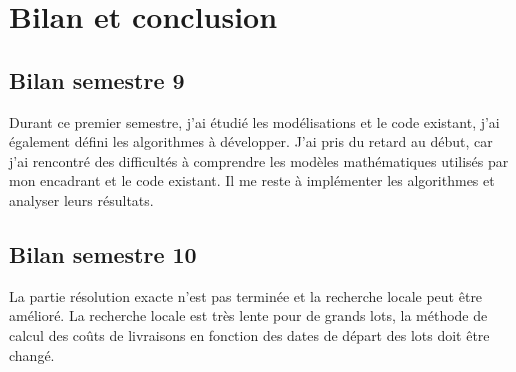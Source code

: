 \chapter{Bilan et conclusion}

\section{Bilan semestre 9}
Durant ce premier semestre, j'ai étudié les modélisations et le code existant, j'ai également défini les algorithmes à développer.
J'ai pris du retard au début, car j'ai rencontré des difficultés à comprendre les modèles mathématiques utilisés par mon encadrant et le code existant.
Il me reste à implémenter les algorithmes et analyser leurs résultats.

\section{Bilan semestre 10}

La partie résolution exacte n'est pas terminée et la recherche locale peut être amélioré.
La recherche locale est très lente pour de grands lots, la méthode de calcul des coûts de livraisons en fonction des dates de départ des lots doit être changé.